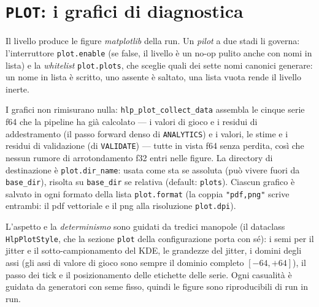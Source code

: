 \section{\texttt{PLOT}: i grafici di diagnostica}

Il livello produce le figure \emph{matplotlib} della run. Un \emph{pilot} a
due stadi li governa: l'interruttore \texttt{plot.enable} (se false, il
livello è un no-op pulito anche con nomi in lista) e la \emph{whitelist}
\texttt{plot.plots}, che sceglie quali dei sette nomi canonici generare: un
nome in lista è scritto, uno assente è saltato, una lista vuota rende il
livello inerte.

I grafici non rimisurano nulla: \texttt{hlp\_plot\_collect\_data} assembla
le cinque serie f64 che la pipeline ha già calcolato — i valori di gioco e
i residui di addestramento (il passo forward denso di
\texttt{ANALYTICS}) e i valori, le stime e i residui di validazione (di
\texttt{VALIDATE}) — tutte in vista f64 senza perdita, così che nessun
rumore di arrotondamento f32 entri nelle figure. La directory di
destinazione è \texttt{plot.dir\_name}: usata come sta se assoluta (può
vivere fuori da \texttt{base\_dir}), risolta su \texttt{base\_dir} se
relativa (default: \texttt{plots}). Ciascun grafico è salvato in ogni
formato della lista \texttt{plot.format} (la coppia \texttt{"pdf,png"}
scrive entrambi: il pdf vettoriale e il png alla risoluzione
\texttt{plot.dpi}).

L'aspetto e la \emph{determinismo} sono guidati da tredici manopole (il
dataclass \texttt{HlpPlotStyle}, che la sezione \texttt{plot} della
configurazione porta con sé): i semi per il jitter e il
sotto-campionamento del KDE, le grandezze del jitter, i domini degli assi
(gli assi di valore di gioco sono sempre il dominio completo $[-64,
+64]$), il passo dei tick e il posizionamento delle etichette delle serie.
Ogni casualità è guidata da generatori con seme fisso, quindi le figure
sono riproducibili di run in run.

